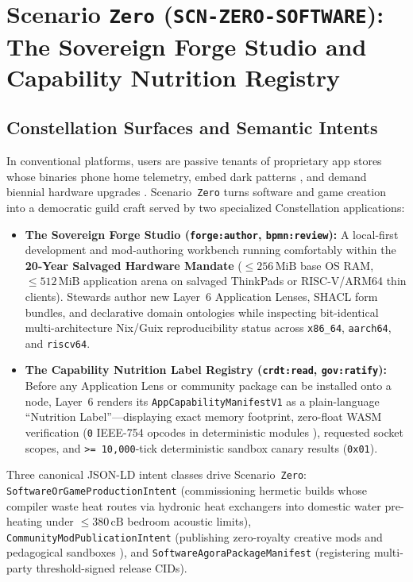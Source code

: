 \section{Scenario \texttt{Zero} (\texttt{SCN-ZERO-SOFTWARE}): The Sovereign Forge Studio and Capability Nutrition Registry}
\label{sec:wave-a-zero}

\subsection{Constellation Surfaces and Semantic Intents}

In conventional platforms, users are passive tenants of proprietary app stores whose binaries phone home telemetry, embed dark patterns \parencite{gray2018darkpatterns}, and demand biennial hardware upgrades \parencite{kucklich2005}. Scenario~\texttt{Zero} turns software and game creation into a democratic guild craft served by two specialized Constellation applications:
\begin{itemize}
    \item \textbf{The Sovereign Forge Studio (\texttt{forge:author}, \texttt{bpmn:review}):} A local-first development and mod-authoring workbench running comfortably within the \textbf{20-Year Salvaged Hardware Mandate} ($\le 256\,\mathrm{MiB}$ base OS RAM, $\le 512\,\mathrm{MiB}$ application arena on salvaged ThinkPads or RISC-V/ARM64 thin clients). Stewards author new Layer~6 Application Lenses, SHACL form bundles, and declarative domain ontologies while inspecting bit-identical multi-architecture Nix/Guix reproducibility status across \texttt{x86\_64}, \texttt{aarch64}, and \texttt{riscv64}.
    \item \textbf{The Capability Nutrition Label Registry (\texttt{crdt:read}, \texttt{gov:ratify}):} Before any Application Lens or community package can be installed onto a node, Layer~6 renders its \texttt{AppCapabilityManifestV1} as a plain-language ``Nutrition Label''---displaying exact memory footprint, zero-float WASM verification (\texttt{0} IEEE-754 opcodes in deterministic modules \parencite{haas2017wasm}), requested socket scopes, and \texttt{>= 10,000}-tick deterministic sandbox canary results (\texttt{0x01}).
\end{itemize}

Three canonical JSON-LD intent classes drive Scenario~\texttt{Zero}: \texttt{SoftwareOrGameProductionIntent} (commissioning hermetic builds whose compiler waste heat routes via hydronic heat exchangers into domestic water pre-heating under $\le 380\,\mathrm{cB}$ bedroom acoustic limits), \texttt{CommunityModPublicationIntent} (publishing zero-royalty creative mods and pedagogical sandboxes \parencite{girard2013}), and \texttt{SoftwareAgoraPackageManifest} (registering multi-party threshold-signed release CIDs).

